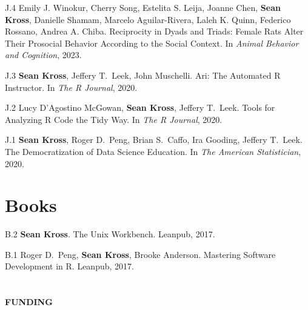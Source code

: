 \begin{bibenum}

\item[J.4] Emily J. Winokur, Cherry Song, Estelita S. Leija, Joanne Chen, 
\textbf{Sean Kross}, Danielle Shamam, Marcelo Aguilar-Rivera, Laleh K. Quinn, 
Federico Rossano, Andrea A. Chiba.
Reciprocity in Dyads and Triads: Female Rats Alter Their Prosocial Behavior 
According to the Social Context.
In \emph{Animal Behavior and Cognition}, 2023.

\item[J.3] \textbf{Sean Kross}, Jeffery T.\ Leek, John Muschelli.
Ari: The Automated R Instructor. 
In \emph{The R Journal}, 2020.

\item[J.2] Lucy D'Agostino McGowan, \textbf{Sean Kross}, Jeffery T.\ Leek.
Tools for Analyzing R Code the Tidy Way. 
In \emph{The R Journal}, 2020.

\item[J.1] \textbf{Sean Kross}, Roger D.\ Peng, Brian S.\ Caffo, Ira Gooding,
Jeffery T.\ Leek. The Democratization of Data Science Education. 
In \emph{The American Statistician}, 2020.

\end{bibenum}

\vspace{0.1in}

\section{Books}

\begin{bibenum}

\item[B.2] \textbf{Sean Kross}. The Unix Workbench. Leanpub, 2017.

\item[B.1] Roger D.\ Peng, \textbf{Sean Kross}, Brooke Anderson. Mastering 
Software Development in R. Leanpub, 2017.

\end{bibenum}


\section{} \vspace{0.2in} \textbf{FUNDING} \vspace{0.05in}

